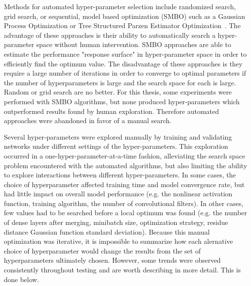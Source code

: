 Methods for automated hyper-parameter selection include randomized search, grid search, or  sequential, model based optimization (SMBO) such as a Gaussian Process Optimization or Tree Structured Parzen Estimator Optimization~\cite{bergstra2011}.
The advantage of these approaches is their ability to automatically search a hyper-parameter space without human intervention. 
SMBO approaches are able to estimate the performance "response surface" in hyper-parameter space in order to efficiently find the optimum value.
The disadvantage of these approaches is they require a large number of iterations in order to converge to optimal parameters if the number of hyperparameters is large and the search space for each is large. 
Random or grid search are no better.
For this thesis, some experiments were performed with SMBO algorithms, but none produced hyper-parameters which outperformed results found by human exploration.
Therefore automated approaches were abandoned in favor of a manual search.

Several hyper-parameters were explored manually by training and validating networks under different settings of the hyper-parameters.
This exploration occurred in a one-hyper-parameter-at-a-time fashion, alleviating the search space problem encountered with the automated algorithms, but also limiting the ability to explore interactions between different hyper-parameters.
In some cases, the choice of hyperparameter affected training time and model convergence rate, but had little impact on overall model performance (e.g. the nonlinear activation function, training algorithm, the number of convolutional filters).
In other cases, few values had to be searched before a local optimum was found (e.g. the number of dense layers after merging, minibatch size, optimization strategy, residue distance Gaussian function standard deviation).
Because this manual optimization was iterative, it is impossible to summarize how each alernative  choice of hyperparameter would change the results from the set of hyperparameters ultimately chosen.
However, some trends were observed consistently throughout testing and are worth describing in more detail.
This is done below.

